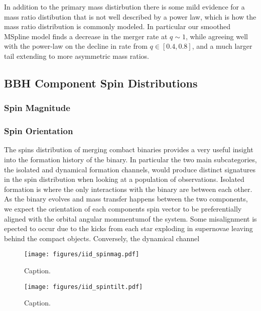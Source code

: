 In addition to the primary mass distirbution there is some mild evidence for a mass ratio distibution that is not well described by a power law, 
which is how the mass ratio distribution is commonly modeled. In particular our smoothed MSpline model finds a decrease in the merger rate at $q\sim1$, 
while agreeing well with the power-law on the decline in rate from $q \in [0.4, 0.8]$, and a much larger tail extending to more asymmetric
mass ratios. 

\subsection{BBH Component Spin Distributions} \label{sec:spin_dist}

\subsubsection{Spin Magnitude}

\subsubsection{Spin Orientation}

The spins distribution of merging combact binaries provides a very useful insight into the formation history of the binary. In particular the two main subcategories, 
the isolated and dynamical formation channels, would produce distinct signatures in the spin distribution when looking at a population of observations. Isolated formation
is where the only interactions with the binary are between each other. As the binary evolves and mass transfer happens between the two components, we expect the orientation
of each components spin vector to be preferentially aligned with the orbital angular mommentumof the system. Some misalignment is epected to occur due to the kicks from 
each star exploding in supernovae leaving behind the compact objects. Conversely, the dynamical channel     
\begin{figure}
    \texttt{[image: figures/iid\_spinmag.pdf]}
    \caption{Caption.}
    \label{fig:iid_spinmag_dist}
\end{figure}

\begin{figure}
    \texttt{[image: figures/iid\_spintilt.pdf]}
    \caption{Caption.}
    \label{fig:iid_spintilt_dist}
\end{figure}

